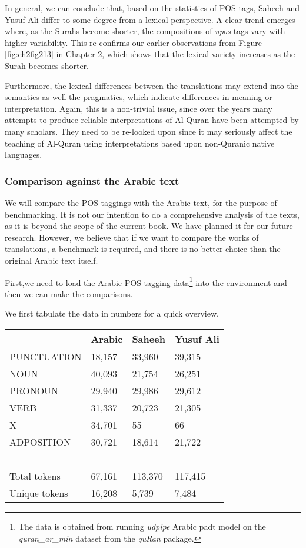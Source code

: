 \documentclass[
]{article}
\begin{document}
In general, we can conclude that, based on the statistics of POS tags, Saheeh and Yusuf Ali differ to some degree from a lexical perspective. A clear trend emerges where, as the Surahs become shorter, the compositions of \emph{upos} tags vary with higher variability. This re-confirms our earlier observations from Figure \ref{fig:ch2fig213} in Chapter 2, which shows that the lexical variety increases as the Surah becomes shorter.

Furthermore, the lexical differences between the translations may extend into the semantics as well the pragmatics, which indicate differences in meaning or interpretation. Again, this is a non-trivial issue, since over the years many attempts to produce reliable interpretations of Al-Quran have been attempted by many scholars. They need to be re-looked upon since it may seriously affect the teaching of Al-Quran using interpretations based upon non-Quranic native languages.

\hypertarget{comparison-against-the-arabic-text}{%
\subsubsection{Comparison against the Arabic text}\label{comparison-against-the-arabic-text}}

We will compare the POS taggings with the Arabic text, for the purpose of benchmarking. It is not our intention to do a comprehensive analysis of the texts, as it is beyond the scope of the current book. We have planned it for our future research. However, we believe that if we want to compare the works of translations, a benchmark is required, and there is no better choice than the original Arabic text itself.

First,we need to load the Arabic POS tagging data\footnote{The data is obtained from running \emph{udpipe} Arabic padt model on the \emph{quran\_ar\_min} dataset from the \emph{quRan} package.} into the environment and then we can make the comparisons.

We first tabulate the data in numbers for a quick overview.

\begin{longtable}[]{@{}llll@{}}
\toprule\noalign{}
& Arabic & Saheeh & Yusuf Ali \\
\midrule\noalign{}
\endhead
\bottomrule\noalign{}
\endlastfoot
PUNCTUATION & 18,157 & 33,960 & 39,315 \\
NOUN & 40,093 & 21,754 & 26,251 \\
PRONOUN & 29,940 & 29,986 & 29,612 \\
VERB & 31,337 & 20,723 & 21,305 \\
X & 34,701 & 55 & 66 \\
ADPOSITION & 30,721 & 18,614 & 21,722 \\
----------------- & --------- & --------- & ------------ \\
Total tokens & 67,161 & 113,370 & 117,415 \\
Unique tokens & 16,208 & 5,739 & 7,484 \\
\end{longtable}
\end{document}
